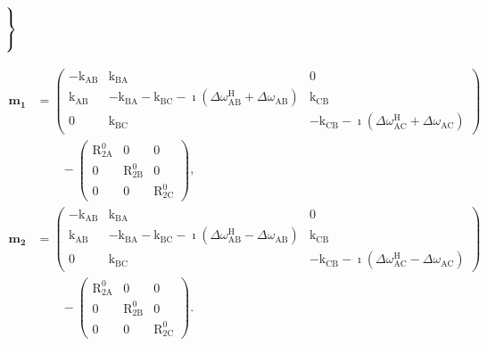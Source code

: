 \documentclass[a4paper,11pt,twoside,openright]{book}
\def\lthtmlcheckvsize{\ifdim\ht\sizebox<\vsize 
  \ifdim\wd\sizebox<\hsize\expandafter\hfill\fi \expandafter\vfill
  \else\expandafter\vss\fi}%
\begin{document}
{\newpage\clearpage
{}%
$\displaystyle \left.\vphantom{ Re \left[ \frac{0.5}{p_{\textrm{A}}}
\begin{pmatrix}1&0&0\end{pmatrix} \cdot \left( \mathbf{AB} + \mathbf{CD} \right) \cdot \begin{pmatrix}p_{\textrm{A}}\\ p_{\textrm{B}}\\ p_{\textrm{C}}\end{pmatrix}
\right] }\right\}$%
\lthtmlindisplaymathZ
\lthtmlcheckvsize\clearpage}

{\newpage\clearpage
\setcounter{equation}{68}
%
\begin{subequations}\begin{align}
\mathbf{m_1} &= \begin{pmatrix}
-\textrm{k}_{\textrm{AB}}& \textrm{k}_{\textrm{BA}}& 0    \\
\textrm{k}_{\textrm{AB}}& -\textrm{k}_{\textrm{BA}}-\textrm{k}_{\textrm{BC}}-\imath(\Delta\omega^{\scriptscriptstyle\mathrm{H}}_{\textrm{AB}}+ \Delta\omega_{\textrm{AB}})   & \textrm{k}_{\textrm{CB}}\\
0       & \textrm{k}_{\textrm{BC}}& - \textrm{k}_{\textrm{CB}}-\imath(\Delta\omega^{\scriptscriptstyle\mathrm{H}}_{\textrm{AC}}+ \Delta\omega_{\textrm{AC}})
\end{pmatrix}   \\
&\qquad - \begin{pmatrix}
\mathrm{R}_{\mathrm{2A}}^0& 0          & 0    \\
0          & \mathrm{R}_{\mathrm{2B}}^0& 0    \\
0          & 0          & \mathrm{R}_{\mathrm{2C}}^0
\end{pmatrix}, \\
\mathbf{m_2} &= \begin{pmatrix}
-\textrm{k}_{\textrm{AB}}& \textrm{k}_{\textrm{BA}}& 0    \\
\textrm{k}_{\textrm{AB}}& -\textrm{k}_{\textrm{BA}}-\textrm{k}_{\textrm{BC}}-\imath(\Delta\omega^{\scriptscriptstyle\mathrm{H}}_{\textrm{AB}}- \Delta\omega_{\textrm{AB}})   & \textrm{k}_{\textrm{CB}}\\
0       & \textrm{k}_{\textrm{BC}}& -\textrm{k}_{\textrm{CB}}-\imath(\Delta\omega^{\scriptscriptstyle\mathrm{H}}_{\textrm{AC}}- \Delta\omega_{\textrm{AC}})
\end{pmatrix}  \nonumber \\
&\qquad - \begin{pmatrix}
\mathrm{R}_{\mathrm{2A}}^0& 0          & 0    \\
0          & \mathrm{R}_{\mathrm{2B}}^0& 0    \\
0          & 0          & \mathrm{R}_{\mathrm{2C}}^0
\end{pmatrix}.
\end{align}\end{subequations}%
\lthtmldisplayZ
\lthtmlcheckvsize\clearpage}
\end{document}
